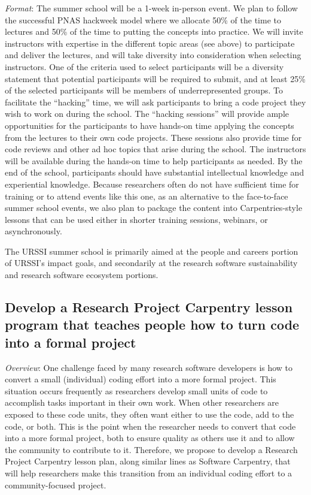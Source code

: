 \documentclass[
]{book}
\begin{document}
\emph{Format}: The summer school will be a 1-week in-person event. We plan to follow the
successful PNAS hackweek model \citep{Huppenkothen8872} where we allocate 50\% of the time
to lectures and 50\% of the time to putting the concepts into practice. We will
invite instructors with expertise in the different topic areas (see above) to participate
and deliver the lectures, and will take diversity into consideration when selecting instructors.
One of the criteria used to select participants will be a diversity statement that potential participants
will be required to submit, and at least 25\% of the selected participants will be members of underrepresented groups.
To facilitate the ``hacking'' time,
we will ask participants to bring a code project they wish to work on during the
school. The ``hacking sessions'' will provide ample opportunities for the participants to
have hands-on time applying the concepts from the lectures to their own code projects. These sessions
also provide time for code reviews and other ad hoc topics that arise during the school.
The instructors will be available during the hands-on time to help participants as
needed. By the end of the school, participants should have substantial intellectual
knowledge and experiential knowledge. Because researchers often do not have sufficient
time for training or to attend events like this one, as an alternative to the face-to-face
summer school events, we also plan to package the content into Carpentries-style lessons
that can be used either in shorter training sessions, webinars, or asynchronously.

The URSSI summer school is primarily aimed at the people and careers portion of URSSI's impact goals, and secondarily at the research software sustainability and research software ecosystem portions.

\hypertarget{develop-a-research-project-carpentry-lesson-program-that-teaches-people-how-to-turn-code-into-a-formal-project}{%
\subsection{Develop a Research Project Carpentry lesson program that teaches people how to turn code into a formal project}\label{develop-a-research-project-carpentry-lesson-program-that-teaches-people-how-to-turn-code-into-a-formal-project}}

\emph{Overview}: One challenge faced by many research software developers is how to convert
a small (individual) coding effort into a more formal project. This situation occurs
frequently as researchers develop small units of code to accomplish tasks important in
their own work. When other researchers are exposed to these code units, they often want
either to use the code, add to the code, or both. This is the point when the researcher
needs to convert that code into a more formal project, both to ensure quality as others
use it and to allow the community to contribute to it. Therefore, we propose to develop
a Research Project Carpentry lesson plan, along similar lines as Software Carpentry, that
will help researchers make this transition from an individual coding effort to a
community-focused project.
\end{document}
